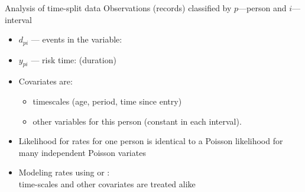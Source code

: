 \begin{frame}[fragile]{Analysis of time-split data}
Observations (records) classified by $p$---person and $i$---interval
\begin{itemize}[<+->]
\item $d_{pi}$ --- events in the variable: 
\item $y_{pi}$ --- risk time:  (duration)\\
\item Covariates are:

\begin{itemize}
\item timescales (age, period, time since entry)
\item other variables for this person (constant in each interval).
\end{itemize}

\item Likelihood for rates for one person is identical to a Poisson
  likelihood for many independent Poisson variates
\item Modeling rates using  or :\\
  time-scales and other covariates are treated alike
\end{itemize}
\end{frame}


